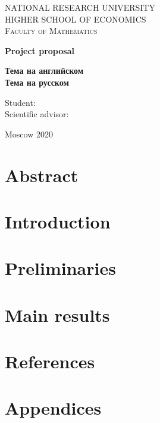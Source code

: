 \documentclass[11pt,a4paper,final,dvips]{article}
\theoremstyle{definition}
\begin{document}
\begin{center}
{\scshape NATIONAL RESEARCH UNIVERSITY \\
HIGHER SCHOOL OF ECONOMICS\\[1ex]
Faculty of Mathematics\par}

\par\vfill

\textbf{\large Project proposal}

\vspace{1.5cm}

{\Large\bfseries
Тема на английском\\
Тема на русском
\par}

\vspace{1.5cm}


\par\vfill
\noindent\hspace{0.52\textwidth}\parbox[t]{0.48\textwidth}{%
Student: \\[1ex]
Scientific advisor: 
}%
\par\vfill
Moscow 2020
\end{center}
\thispagestyle{empty}
\pagebreak

\section*{Abstract}
\section*{Introduction}
\section*{Preliminaries}
\section*{Main results}
\section*{References}
\section*{Appendices}
\end{document}
